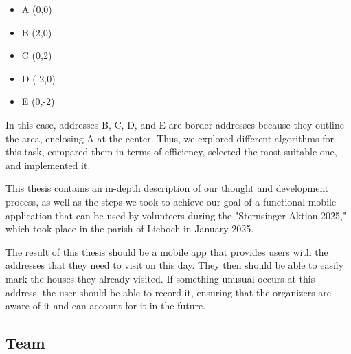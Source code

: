     \begin{itemize}
        \item A (0,0)
        \item B (2,0)
        \item C (0,2)
        \item D (-2,0)
        \item E (0,-2)
    \end{itemize}


In this case, addresses B, C, D, and E are border addresses because they outline the area, enclosing A at the center.
 Thus, we explored different algorithms for this task, compared them in terms of efficiency, selected the most suitable one, and implemented it.

\blankLine

This thesis contains an in-depth description of our thought and development process, as well as the steps we took to achieve our goal of a functional mobile application that can be used by volunteers during the "Sternsinger-Aktion 2025," which took place in the parish of Lieboch in January 2025.

\blankLine

The result of this thesis should be a mobile app that provides users with the addresses that they need to visit on this day. They then should be able to easily mark the houses they already visited. If something unusual occurs at this address, the user should be able to record it, ensuring that the organizers are aware of it and can account for it in the future.

\newpage

\subsection{Team}

